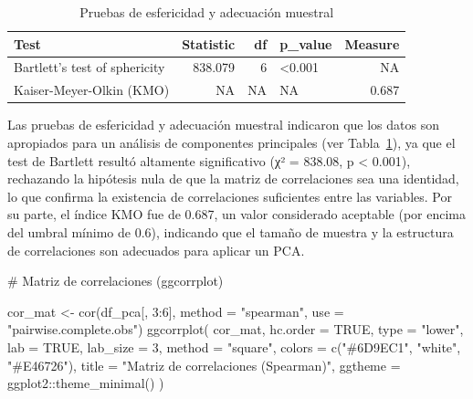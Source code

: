 \documentclass[
  spanish,
  11pt,
  a4paper,
  DIV=11,
  numbers=noendperiod]{scrartcl}
\newenvironment{Shaded}{\begin{snugshade}}{\end{snugshade}}
\newcommand{\AttributeTok}[1]{\textcolor[rgb]{0.40,0.45,0.13}{#1}}
\newcommand{\CommentTok}[1]{\textcolor[rgb]{0.37,0.37,0.37}{#1}}
\newcommand{\ConstantTok}[1]{\textcolor[rgb]{0.56,0.35,0.01}{#1}}
\newcommand{\DecValTok}[1]{\textcolor[rgb]{0.68,0.00,0.00}{#1}}
\newcommand{\FunctionTok}[1]{\textcolor[rgb]{0.28,0.35,0.67}{#1}}
\newcommand{\NormalTok}[1]{\textcolor[rgb]{0.00,0.23,0.31}{#1}}
\newcommand{\OtherTok}[1]{\textcolor[rgb]{0.00,0.23,0.31}{#1}}
\newcommand{\SpecialCharTok}[1]{\textcolor[rgb]{0.37,0.37,0.37}{#1}}
\newcommand{\StringTok}[1]{\textcolor[rgb]{0.13,0.47,0.30}{#1}}
\begin{document}
\begin{longtable}[]{@{}lrrlr@{}}

\caption{\label{tbl-pca-bartlett-kmo}Pruebas de esfericidad y adecuación
muestral}

\tabularnewline

\toprule\noalign{}
Test & Statistic & df & p\_value & Measure \\
\midrule\noalign{}
\endhead
\bottomrule\noalign{}
\endlastfoot
Bartlett's test of sphericity & 838.079 & 6 & \textless0.001 & NA \\
Kaiser-Meyer-Olkin (KMO) & NA & NA & NA & 0.687 \\

\end{longtable}

Las pruebas de esfericidad y adecuación muestral indicaron que los datos
son apropiados para un análisis de componentes principales (ver
Tabla~\ref{tbl-pca-bartlett-kmo}), ya que el test de Bartlett resultó
altamente significativo (χ² = 838.08, p \textless{} 0.001), rechazando
la hipótesis nula de que la matriz de correlaciones sea una identidad,
lo que confirma la existencia de correlaciones suficientes entre las
variables. Por su parte, el índice KMO fue de 0.687, un valor
considerado aceptable (por encima del umbral mínimo de 0.6), indicando
que el tamaño de muestra y la estructura de correlaciones son adecuados
para aplicar un PCA.

\begin{Shaded}
\begin{Highlighting}[numbers=left,,]
\CommentTok{\# Matriz de correlaciones (ggcorrplot)}

\NormalTok{cor\_mat }\OtherTok{\textless{}{-}} \FunctionTok{cor}\NormalTok{(df\_pca[, }\DecValTok{3}\SpecialCharTok{:}\DecValTok{6}\NormalTok{], }\AttributeTok{method =} \StringTok{"spearman"}\NormalTok{, }
               \AttributeTok{use =} \StringTok{"pairwise.complete.obs"}\NormalTok{)}
\FunctionTok{ggcorrplot}\NormalTok{(}
\NormalTok{  cor\_mat, }
  \AttributeTok{hc.order =} \ConstantTok{TRUE}\NormalTok{, }
  \AttributeTok{type =} \StringTok{"lower"}\NormalTok{, }
  \AttributeTok{lab =} \ConstantTok{TRUE}\NormalTok{,}
  \AttributeTok{lab\_size =} \DecValTok{3}\NormalTok{,}
  \AttributeTok{method =} \StringTok{"square"}\NormalTok{,}
  \AttributeTok{colors =} \FunctionTok{c}\NormalTok{(}\StringTok{"\#6D9EC1"}\NormalTok{, }\StringTok{"white"}\NormalTok{, }\StringTok{"\#E46726"}\NormalTok{),}
  \AttributeTok{title =} \StringTok{"Matriz de correlaciones (Spearman)"}\NormalTok{,}
  \AttributeTok{ggtheme =}\NormalTok{ ggplot2}\SpecialCharTok{::}\FunctionTok{theme\_minimal}\NormalTok{()}
\NormalTok{)}
\end{Highlighting}
\end{Shaded}
\end{document}
